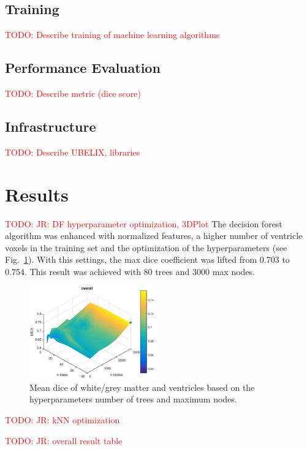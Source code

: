 \documentclass[journal]{IEEEtran}
\newcommand\TODO[1]{\textcolor{red}{TODO: #1}}
\begin{document}
\subsection{Training}
\TODO{Describe training of machine learning algorithms}

\subsection{Performance Evaluation}
\TODO{Describe metric (dice score)}

\subsection{Infrastructure}
\TODO{Describe UBELIX, libraries}


\section{Results}

\TODO{JR: DF hyperparameter optimization, 3DPlot}
The decision forest algorithm was enhanced with normalized features, a higher number of ventricle voxels in the training set and the optimization of the hyperparameters (see Fig.~\ref{f.df_white}). With this settings, the max dice coefficient was lifted from 0.703 to 0.754. This result was achieved with 80 trees and 3000 max nodes.

\begin{figure}[h!]\label{f.df_white}
	\centering
	\includegraphics[width=0.48\textwidth]{images/DF_crossval}
	\caption{Mean dice of white/grey matter and ventricles based on the hyperparameters number of trees and maximum nodes.}
\end{figure}

\TODO{JR: kNN optimization}


\TODO{JR: overall result table}\\
\end{document}
